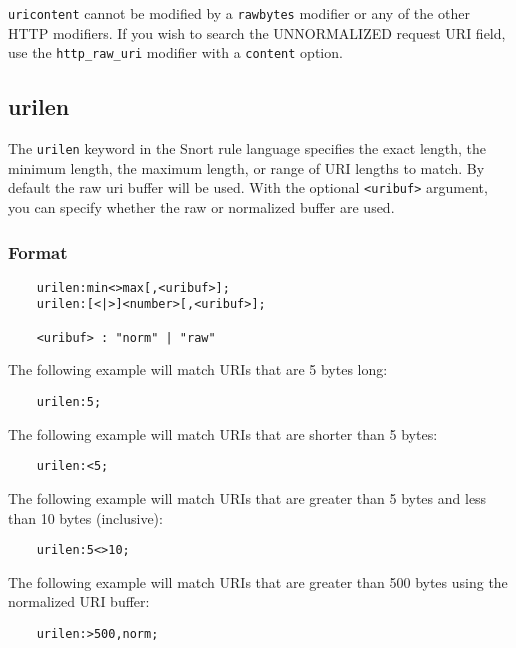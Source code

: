 \documentclass[english]{report}
\newenvironment{note}{
\samepage
    \vspace{10pt}{\textsf{
        {\hspace{7pt}\Huge{$\triangle$\hspace{-12.5pt}{\Large{$^!$}}}}\hspace{5pt}
        {\Large{NOTE}}
    }
    }
   \begin{center}
    \par\vspace{-17pt}

    \begin{lrbox}{\savepar}
    \begin{minipage}[r]{6in}
}
{
    \end{minipage}
    \end{lrbox}
    \fbox{
        \usebox{
            \savepar
	}
    }
    \par\vskip10pt
    \end{center}
}
\newenvironment{note}{
        \begin{rawhtml}
        <p><table border="1"><tr><td><b>
        Note:&nbsp;&nbsp;</b>
        \end{rawhtml}
}{
        \begin{rawhtml}
        </b></td></tr></table></p>
        \end{rawhtml}
}
\begin{document}
\begin{note}

\texttt{uricontent} cannot be modified by a \texttt{rawbytes} modifier or any
of the other HTTP modifiers.  If you wish to search the UNNORMALIZED
request \textsc{URI} field, use the \texttt{http\_raw\_uri} modifier with a
\texttt{content} option.

\end{note}

\subsection{urilen}

The \texttt{urilen} keyword in the Snort rule language specifies the exact
length, the minimum length, the maximum length, or range of URI lengths to
match.  By default the raw uri buffer will be used.  With the optional
\texttt{<uribuf>} argument, you can specify whether the raw or normalized
buffer are used.

\subsubsection{Format}

\begin{verbatim}
    urilen:min<>max[,<uribuf>];
    urilen:[<|>]<number>[,<uribuf>];

    <uribuf> : "norm" | "raw"
\end{verbatim}

The following example will match URIs that are 5 bytes long:

\begin{verbatim}
    urilen:5;
\end{verbatim}

The following example will match URIs that are shorter than 5 bytes:

\begin{verbatim}
    urilen:<5;
\end{verbatim}

The following example will match URIs that are greater than 5 bytes and less
than 10 bytes (inclusive):

\begin{verbatim}
    urilen:5<>10;
\end{verbatim}

The following example will match URIs that are greater than 500 bytes using the
normalized URI buffer:

\begin{verbatim}
    urilen:>500,norm;
\end{verbatim}
\end{document}
